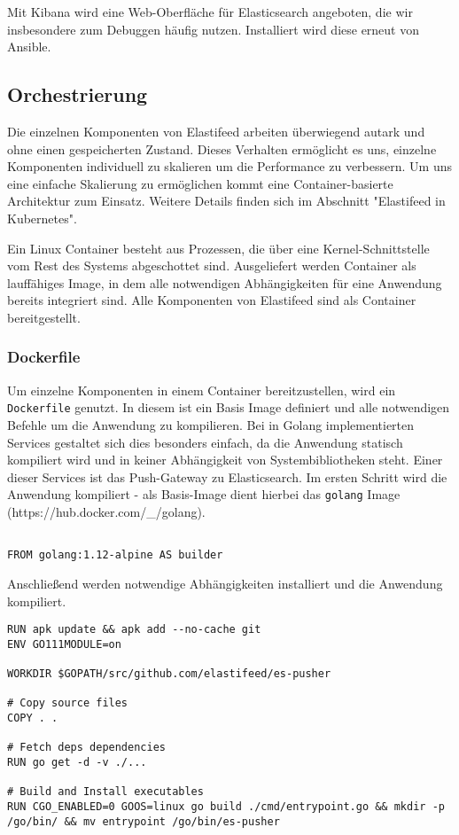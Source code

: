 Mit Kibana wird eine Web-Oberfläche für Elasticsearch angeboten, die wir insbesondere zum Debuggen häufig nutzen. Installiert wird diese erneut von Ansible.
\endsubsection

\subsection{Orchestrierung}
Die einzelnen Komponenten von Elastifeed arbeiten überwiegend autark und ohne einen gespeicherten Zustand.
Dieses Verhalten ermöglicht es uns, einzelne Komponenten individuell zu skalieren um die Performance zu verbessern.
Um uns eine einfache Skalierung zu ermöglichen kommt eine Container-basierte Architektur zum Einsatz.
Weitere Details finden sich im Abschnitt "Elastifeed in Kubernetes".

Ein Linux Container besteht aus Prozessen, die über eine Kernel-Schnittstelle vom Rest des Systems abgeschottet sind. Ausgeliefert werden Container als lauffähiges Image, in dem alle notwendigen Abhängigkeiten für eine Anwendung bereits integriert sind.
Alle Komponenten von Elastifeed sind als Container bereitgestellt.

\endsubsubsection

\subsubsection{Dockerfile}

Um einzelne Komponenten in einem Container bereitzustellen, wird ein \texttt{Dockerfile} genutzt.
In diesem ist ein Basis Image definiert und alle notwendigen Befehle um die Anwendung zu kompilieren.
Bei in Golang implementierten Services gestaltet sich dies besonders einfach, da die Anwendung statisch kompiliert wird und in keiner Abhängigkeit von Systembibliotheken steht.
Einer dieser Services ist das Push-Gateway zu Elasticsearch.
Im ersten Schritt wird die Anwendung kompiliert - als Basis-Image dient hierbei das \texttt{golang} Image (https://hub.docker.com/\_/golang).

\begin{lstlisting}

FROM golang:1.12-alpine AS builder

\end{lstlisting}

Anschließend werden notwendige Abhängigkeiten installiert und die Anwendung kompiliert.

\begin{lstlisting}
RUN apk update && apk add --no-cache git
ENV GO111MODULE=on

WORKDIR $GOPATH/src/github.com/elastifeed/es-pusher

# Copy source files
COPY . .

# Fetch deps dependencies
RUN go get -d -v ./...

# Build and Install executables
RUN CGO_ENABLED=0 GOOS=linux go build ./cmd/entrypoint.go && mkdir -p /go/bin/ && mv entrypoint /go/bin/es-pusher
\end{lstlisting}

